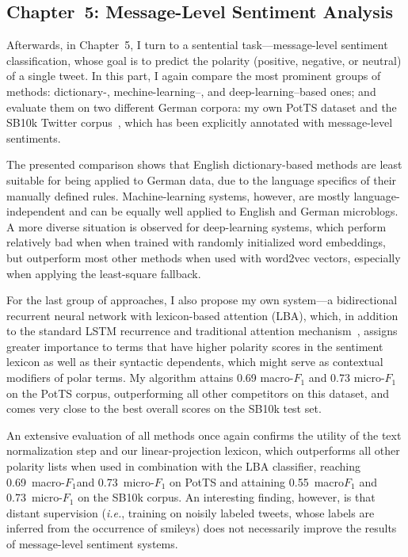\documentclass[11pt]{article}
\newcommand{\ienocomma}{\textit{i.e.}}
\newcommand{\ie}{\ienocomma,}
\newcommand{\F}[0]{$F_1$}
\renewcommand{\cite}{\citep}
\begin{document}
\subsection{Chapter~5: Message-Level Sentiment Analysis}

Afterwards, in Chapter~5, I turn to a sentential task---message-level
sentiment classification, whose goal is to predict the polarity
(positive, negative, or neutral) of a single tweet.  In this part, I
again compare the most prominent groups of methods: dictionary-,
mechine-learning--, and deep-learning--based ones; and evaluate them
on two different German corpora: my own PotTS dataset and the SB10k
Twitter corpus~\cite{Cieliebak:17}, which has been explicitly
annotated with message-level sentiments.

The presented comparison shows that English dictionary-based methods
are least suitable for being applied to German data, due to the
language specifics of their manually defined rules.  Machine-learning
systems, however, are mostly language-independent and can be equally
well applied to English and German microblogs.  A more diverse
situation is observed for deep-learning systems, which perform
relatively bad when when trained with randomly initialized word
embeddings, but outperform most other methods when used with word2vec
vectors, especially when applying the least-square fallback.

For the last group of approaches, I also propose my own system---a
bidirectional recurrent neural network with lexicon-based attention
(LBA), which, in addition to the standard LSTM recurrence and
traditional attention mechanism~\cite{Bahdanau:14}, assigns greater
importance to terms that have higher polarity scores in the sentiment
lexicon as well as their syntactic dependents, which might serve as
contextual modifiers of polar terms.  My algorithm attains 0.69
macro-\F{} and 0.73 micro-\F{} on the PotTS corpus, outperforming all
other competitors on this dataset, and comes very close to the best
overall scores on the SB10k test set.

An extensive evaluation of all methods once again confirms the utility
of the text normalization step and our linear-projection lexicon,
which outperforms all other polarity lists when used in combination
with the LBA classifier, reaching 0.69~macro-\F and 0.73~micro-\F{} on
PotTS and attaining 0.55~macro\F{} and 0.73~micro-\F{} on the SB10k
corpus.  An interesting finding, however, is that distant supervision
(\ie{} training on noisily labeled tweets, whose labels are inferred
from the occurrence of smileys) does not necessarily improve the
results of message-level sentiment systems.
\end{document}
